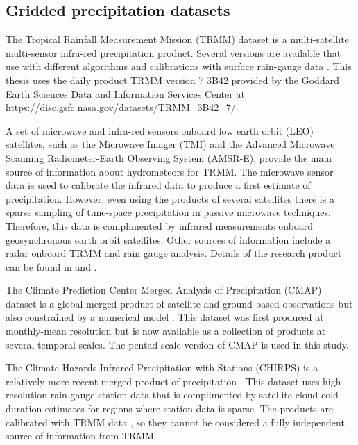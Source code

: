 \subsection{Gridded precipitation datasets}

The Tropical Rainfall Measurement Mission (TRMM) dataset is a multi-satellite multi-sensor infra-red precipitation product. Several versions are available that use with different algorithms and calibrations with surface rain-gauge data \citep{huffman2007}. This thesis uses the daily product TRMM version 7 3B42 provided by the Goddard Earth Sciences Data and Information Services Center \citep{mission2011trmm} at \url{https://disc.gsfc.nasa.gov/datasets/TRMM_3B42_7/}.

 A set of microwave and infra-red sensors onboard low earth orbit (LEO) satellites, such as the Microwave Imager (TMI) and the Advanced Microwave Scanning Radiometer-Earth Observing System (AMSR-E), provide the main source of information about hydrometeors for TRMM. The microwave sensor data is used to calibrate the infrared data to produce a first estimate of precipitation. However, even using the products of several satellites there is a sparse sampling of time-space precipitation  in passive microwave techniques. Therefore, this data is complimented by infrared measurements onboard geosynchronous earth orbit satellites. Other sources of information include a radar onboard TRMM and rain gauge analysis. Details of the research product can be found in \cite{huffman2007} and \cite{mission2011}.

The Climate Prediction Center Merged Analysis of Precipitation (CMAP) dataset is a global merged product of satellite and ground based observations but also constrained by a numerical model \citep{Xie2007}. This dataset was first produced at monthly-mean resolution \citep{xie1997} but is now available as a collection of products at several temporal scales. The pentad-scale version of CMAP is used in this study. %

The Climate Hazards Infrared Precipitation with Stations (CHIRPS) is a relatively more recent merged product of precipitation \citep{funk2015}. This dataset uses high-resolution rain-gauge station data that is complimented by satellite cloud cold duration estimates for regions where station data is sparse. The products are calibrated with TRMM data \citep{funk2015}, so they cannot be considered a fully independent source of information from TRMM.




